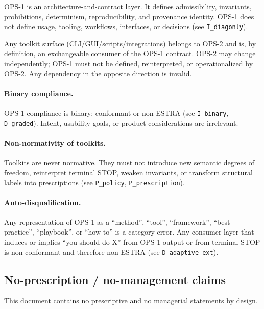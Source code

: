 OPS-1 is an architecture-and-contract layer.
It defines admissibility, invariants, prohibitions, determinism,
reproducibility, and provenance identity.
OPS-1 does not define usage, tooling, workflows, interfaces, or decisions
(see \texttt{I\_diagonly}).

Any toolkit surface (CLI/GUI/scripts/integrations) belongs to OPS-2 and is, by
definition, an exchangeable consumer of the OPS-1 contract.
OPS-2 may change independently; OPS-1 must not be defined, reinterpreted,
or operationalized by OPS-2.
Any dependency in the opposite direction is invalid.

\paragraph{Binary compliance.}
OPS-1 compliance is binary: conformant or non-ESTRA
(see \texttt{I\_binary}, \texttt{D\_graded}).
Intent, usability goals, or product considerations are irrelevant.

\paragraph{Non-normativity of toolkits.}
Toolkits are never normative.
They must not introduce new semantic degrees of freedom,
reinterpret terminal STOP, weaken invariants,
or transform structural labels into prescriptions
(see \texttt{P\_policy}, \texttt{P\_prescription}).

\paragraph{Auto-disqualification.}
Any representation of OPS-1 as a ``method'', ``tool'', ``framework'',
``best practice'', ``playbook'', or ``how-to'' is a category error.
Any consumer layer that induces or implies ``you should do X'' from OPS-1 output
or from terminal STOP is non-conformant and therefore non-ESTRA
(see \texttt{D\_adaptive\_ext}).

\subsection{No-prescription / no-management claims}

This document contains no prescriptive and no managerial statements by design.

